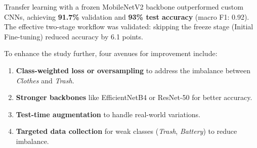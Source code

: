 \documentclass[a4paper,11pt]{article}
\begin{document}
Transfer learning with a frozen MobileNetV2 backbone outperformed custom CNNs, achieving \textbf{91.7\%} validation and \textbf{93\% test accuracy} (macro F1: 0.92). The effective two-stage workflow was validated: skipping the freeze stage (Initial Fine-tuning) reduced accuracy by 6.1 points.
 
To enhance the study further, four avenues for improvement include:
\begin{enumerate}
    \item \textbf{Class-weighted loss or oversampling} to address the imbalance
    between \textit{Clothes} and \textit{Trash}.
    \item \textbf{Stronger backbones} like EfficientNetB4 or ResNet-50 for better
    accuracy.
    \item \textbf{Test-time augmentation} to handle real-world variations.
    \item \textbf{Targeted data collection} for weak classes (\textit{Trash},
    \textit{Battery}) to reduce imbalance.
\end{enumerate}



\end{document}
